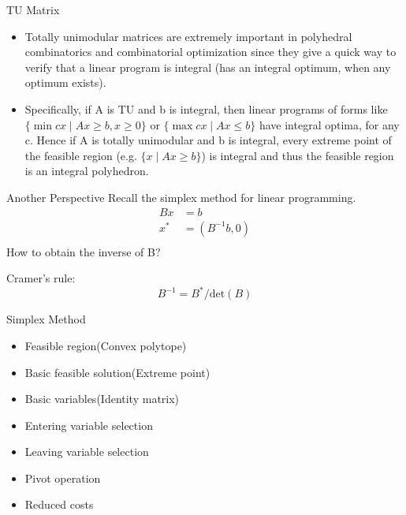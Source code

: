     \begin{frame}{TU Matrix}
      \begin{itemize}
        \item Totally unimodular matrices are extremely important in polyhedral combinatorics and combinatorial optimization since they give a quick way to verify that a linear program is integral (has an integral optimum, when any optimum exists).
        \item Specifically, if A is TU and b is integral, then linear programs of forms like $ \{\min cx\mid Ax\geq b,x\geq 0\} $ or $ \{\max cx\mid Ax\leq b\} $ have integral optima, for any c. Hence if A is totally unimodular and b is integral, every extreme point of the feasible region (e.g. $ \{x\mid Ax\geq b\} $) is integral and thus the feasible region is an integral polyhedron.
      \end{itemize}
    \end{frame}

    \begin{frame}{Another Perspective}
      Recall the simplex method for linear programming.
      \begin{equation*}
        \begin{align}
        Bx &= b \\
        x^* &= (B^{-1}b,0) \\
        \end{align}
      \end{equation*}
      How to obtain the inverse of B?
      \begin{block}
        {Cramer's rule:}
        {\centering\[B^{-1} = B^*/\text{det}(B)\]}
      \end{block}
    \end{frame}

    \begin{frame}{Simplex Method}
      \begin{spacing}{1.5}
        \begin{itemize}
          \item Feasible region(Convex polytope)
          \item Basic feasible solution(Extreme point)
          \item Basic variables(Identity matrix)
          \item Entering variable selection
          \item Leaving variable selection
          \item Pivot operation
          \item Reduced costs
        \end{itemize}
      \end{spacing}
    \end{frame}

